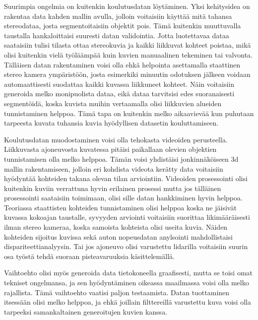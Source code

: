 Suurimpia ongelmia on kuitenkin koulutusdatan löytäminen.
Yksi kehitysidea on rakentaa data kahden mallin avulla, 
jolloin voitaisiin käyttää mitä tahansa stereodataa, josta segmentoitaisiin objektit pois.
Tämä kuitenkin muuttuvalla taustalla hankaloittaisi suuresti datan validointia.
Jotta luotettavaa dataa saataisiin tulisi tilasta ottaa stereokuvia ja kaikki liikkuvat kohteet poistaa,
mikä olisi kuitenkin vielä työläämpää kuin kuvien manuaalinen tekeminen tai valvonta.
Tälläisen datan rakentaminen voisi olla ehkä helpointa asettamalla staattinen stereo kamera ympäristöön,
josta esimerkiki minuutin odotuksen jälkeen voidaan automaattisesti suodattaa kaikki kuvassa liikkuneet kohteet.
Näin voitaisiin generoida melko monipuolista dataa, eikä dataa tarvitsisi edes suoranaisesti segmentöidä,
koska kuvista muihin vertaamalla olisi liikkuvien alueiden tunnistaminen helppoa.
Tämä tapa on kuitenkin melko aikaavievää kun puhutaan tarpeesta kuvata tuhansia kuvia hyödyllisen datasetin kouluttamiseen.

Koulutusdatan muodostaminen voisi olla tehokasta videoiden perusteella.
Liikkuvasta ajoneuvosta kuvatessa pitäisi paikallaan olevien objektien tunnistamisen olla melko helppoa.
Tämän voisi yhdistäisi jonkinnäköiseen 3d mallin rakentamiseen, jolloin eri kohdista videota kerätty data voitaisiin hyödyntää kohteiden takana olevan tilan arviointiin.
Videoiden prosessointi olisi kuitenkin kuviin verrattuna hyvin erilainen prosessi
mutta jos tälläinen prosessointi saataisiin toimimaan, olisi sille datan hankkiminen hyvin helppoa.
Teoriassa staattisten kohteiden tunnistaminen olisi helppoa koska ne jäisivät kuvassa kokoajan taustalle,
syvyyden arviointi voitaisiin suorittaa likimääräisesti ilman stereo kameraa, koska samoista kohteista olisi useita kuvia.
Näiden kohteiden sijoitus kuvissa sekä auton nopeusdatan anylsointi mahdollistaisi dispariteettianalyysin.
Tai jos ajoneuvo olisi varustettu lidarilla voitaisiin suurin osa työstä tehdä suoraan pisteavaruuksia käsittelemällä.

Vaihtoehto olisi myös generoida data tietokoneella graafisesti,
mutta se toisi omat tekniset ongelmansa, ja sen hyödyntäminen oikeassa maailmassa voisi olla melko rajallista.
Tämä vaihtoehto vaatisi paljon testaamista.
Datan tuottaminen itsessään olisi melko helppoa,
ja ehkä joillain filttereillä varustettu kuva voisi olla tarpeeksi samankaltainen generoitujen kuvien kanssa.

